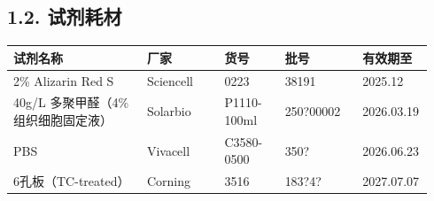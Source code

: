 \documentclass[UTF8,10pt,a4paper,fontset=fandol]{ctexart}
\newcommand{\fieldvalue}[1]{#1}
\newcommand{\handwritten}[1]{#1}
\begin{document}
\subsection*{1.2. 试剂耗材}

\begin{center}
\small
\begin{tabular}{|p{0.31\linewidth}|p{0.18\linewidth}|p{0.14\linewidth}|p{0.18\linewidth}|p{0.13\linewidth}|}
\hline
试剂名称 & 厂家 & 货号 & 批号 & 有效期至 \\
\hline
\fieldvalue{2\% Alizarin Red S} &
\fieldvalue{Sciencell} &
\fieldvalue{0223} &
\fieldvalue{\handwritten{38191}} &
\fieldvalue{\handwritten{2025.12}} \\
\hline
\fieldvalue{40g/L 多聚甲醛（4\%组织细胞固定液）} &
\fieldvalue{Solarbio} &
\fieldvalue{P1110-100ml} &
\fieldvalue{\handwritten{250?00002}} &
\fieldvalue{2026.03.19} \\
\hline
\fieldvalue{PBS} &
\fieldvalue{Vivacell} &
\fieldvalue{C3580-0500} &
\fieldvalue{\handwritten{350?}} &
\fieldvalue{2026.06.23} \\
\hline
\fieldvalue{6孔板（TC-treated）} &
\fieldvalue{Corning} &
\fieldvalue{3516} &
\fieldvalue{\handwritten{183?4?}} &
\fieldvalue{\handwritten{2027.07.07}} \\
\hline
\end{tabular}
\end{center}
\end{document}
